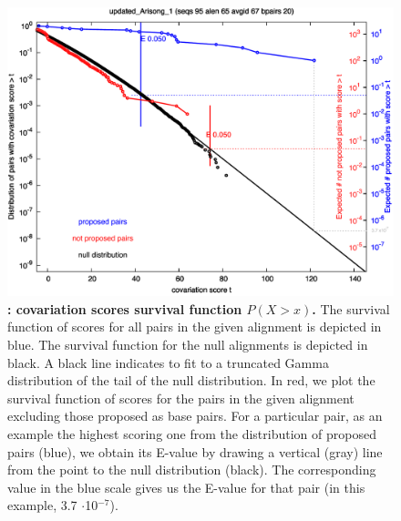  \begin{figure}[h] \includegraphics[scale=0.50]{Arisong_surv.pdf}
 \caption{\small\textbf{:
 covariation scores survival function $P(X>x)$.}  The survival
 function of scores for all pairs in the given alignment is depicted
 in blue. The survival function for the null alignments is depicted in
 black. A black line indicates to fit to a truncated Gamma
 distribution of the tail of the null distribution. In red, we plot
 the survival function of scores for the pairs in the given alignment
 excluding those proposed as base pairs. For a particular pair, as an
 example the highest scoring one from the distribution of proposed
 pairs (blue), we obtain its E-value by drawing a vertical (gray) line
 from the point to the null distribution (black). The corresponding
 value in the blue scale gives us the E-value for that pair (in this
 example, 3.7 $\cdot$10$^{-7}$).
 }
 \label{fig:surv}
 \end{figure}

